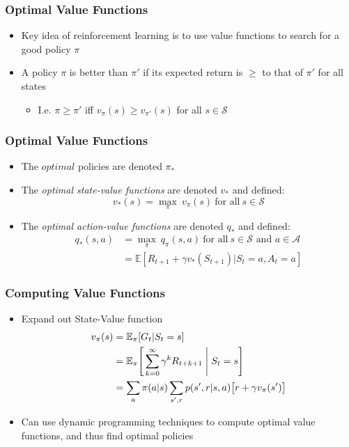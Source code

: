 \documentclass{beamer}
\begin{document}

\begin{frame}
\frametitle{Optimal Value Functions}
\begin{itemize}
\item Key idea of reinforcement learning is to use value functions to search for a good policy $\pi$
\item A policy $\pi$ is better than $\pi'$ if its expected return is $\geq$ to that of $\pi'$ for all states
   \begin{itemize}
   	\item I.e. $\pi \geq \pi'$ iff $v_\pi(s) \geq v_{\pi'}(s)$ for all $s \in \mathscr{S}$
      \end{itemize}
\end{itemize}
\end{frame}



\begin{frame}
\frametitle{Optimal Value Functions}
\begin{itemize}
\item The $optimal$ policies are denoted $\pi_{\ast}$
\item The \textit{optimal state-value functions} are denoted $v_{\ast}$ and defined:
\begin{equation}
v_{\ast}(s) = \underset{\pi}{\max} \ v_\pi(s) \ \textrm{for all} \ s \in \mathscr{S}
\nonumber
\end{equation}
\item The \textit{optimal action-value functions} are denoted $q_{\ast}$ and defined:
\begin{align*}
q_{\ast}(s,a) &= \underset{\pi}{\max} \ q_\pi(s,a) \ \textrm{for all} \ s \in \mathscr{S} \textrm{ and } a \in \mathscr{A} \\
&= \mathbb{E}[R_{t+1} + \gamma v_{\ast}(S_{t+1}) | S_t = a, A_t = a]
\nonumber
\end{align*}
\end{itemize}
\end{frame}


\begin{frame}
\frametitle{Computing Value Functions}
\begin{itemize}
\item Expand out State-Value function
\begin{align*}
v_\pi(s) &= \mathbb{E}_\pi[G_t | S_t = s] \\
&= \mathbb{E}_\pi\Bigg[\sum_{k=0}^{\infty} \gamma^k R_{t+k+1} \Biggm\lvert S_t = s \Bigg] \\
&= \sum_{a}\pi(a|s) \sum_{s',r} p(s',r|s,a) \big[ r + \gamma v_\pi(s') \big]
\nonumber
\end{align*}

\item Can use dynamic programming techniques to compute optimal value functions, and thus find optimal policies 
\end{itemize}
\end{frame}
\end{document}
